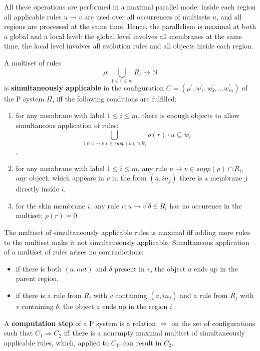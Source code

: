 All these operations are performed in a maximal parallel mode: inside each region all applicable rules $u\rightarrow v$ are used over all occurrences of multisets $u$, and all regions are processed at the same time. Hence, the parallelism is maximal at both a global and a local level: the global level involves all membranes at the same time, the local level involves all evolution rules and all objects inside each region.

\begin{definition}
  A multiset of rules $$\rho: \bigcup_{1\leq i\leq m} R_i \rightarrow \mathbb N$$ is {\bf simultaneously applicable} in the configuration $C = (\mu^\prime, w^\prime_1,w^\prime_2,\ldots w^\prime_m)$ of the P system $\Pi$, iff the following conditions are fulfilled:
  \begin{enumerate}
    \item for any membrane with label $1\leq i\leq m$, there is enough objects to allow simultaneous application of rules: $$ \bigcup_{(r: u\rightarrow v)\in supp(\rho)\cap R_i} \rho(r)\cdot u \subseteq w^\prime_i$$,
    \item for any membrane with label $1\leq i\leq m$, any rule $u\rightarrow v\in supp(\rho)\cap R_i$, any object, which appears in $v$ in the form $(a, in_j)$ there is a membrane $j$ directly inside $i$,
    \item for the skin membrane $i$, any rule $r: u\rightarrow v^\prime\delta\in R_i$ has no occurence in the multiset: $\rho(r)=0$.
  \end{enumerate}  
\end{definition}

The multiset of simultaneously applicable rules is maximal iff adding more rules to the multiset make it not simultaneously applicable. Simultaneous application of a multiset of rules arises no contradictions:

\begin{itemize}
  \item if there is both $(a, out)$ and $\delta$ present in $v$, the object $a$ ends up in the parent region,
  \item if there is a rule from $R_i$ with $v$ containing $(a,in_j)$ and a rule from $R_j$ with $v$ containing $\delta$, the object $a$ ends up in the region $i$ 
\end{itemize}

\begin{definition}
  A {\bf computation step} of a P system is a relation $\Rightarrow$ on the set of configurations such that $C_1 \Rightarrow C_2$ iff there is a nonempty maximal multiset of simultaneously applicable rules, which, applied to $C_1$, can result in $C_2$.
\end{definition}

